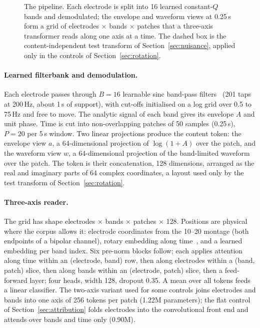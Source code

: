\begin{figure}[t]
\caption{The pipeline. Each electrode is split into 16 learned constant-$Q$ bands and demodulated; the envelope and waveform views at 0.25\,s form a grid of electrodes $\times$ bands $\times$ patches that a three-axis transformer reads along one axis at a time. The dashed box is the content-independent test transform of Section~\ref{sec:nuisance}, applied only in the controls of Section~\ref{sec:rotation}.}
\label{fig:pipeline}
\end{figure}

\paragraph{Learned filterbank and demodulation.}
Each electrode passes through $B = 16$ learnable sinc band-pass filters~\cite{ravanelli2018sincnet} (201 taps at 200\,Hz, about 1\,s of support), with cut-offs initialised on a log grid over 0.5 to 75\,Hz and free to move. The analytic signal of each band gives its envelope $A$ and unit phase. Time is cut into non-overlapping patches of 50 samples (0.25\,s), $P = 20$ per 5\,s window. Two linear projections produce the content token: the envelope view $a$, a 64-dimensional projection of $\log(1 + A)$ over the patch, and the waveform view $w$, a 64-dimensional projection of the band-limited waveform over the patch. The token is their concatenation, 128 dimensions, arranged as the real and imaginary parts of 64 complex coordinates, a layout used only by the test transform of Section~\ref{sec:rotation}.

\paragraph{Three-axis reader.}
The grid has shape electrodes $\times$ bands $\times$ patches $\times$ 128. Positions are physical where the corpus allows it: electrode coordinates from the 10--20 montage (both endpoints of a bipolar channel), rotary embedding along time~\cite{su2024roformer}, and a learned embedding per band index. Six pre-norm blocks follow; each applies attention along time within an (electrode, band) row, then along electrodes within a (band, patch) slice, then along bands within an (electrode, patch) slice, then a feed-forward layer; four heads, width 128, dropout 0.35. A mean over all tokens feeds a linear classifier. The two-axis variant used for some controls joins electrodes and bands into one axis of 256 tokens per patch (1.22M parameters); the flat control of Section~\ref{sec:attribution} folds electrodes into the convolutional front end and attends over bands and time only (0.90M).

